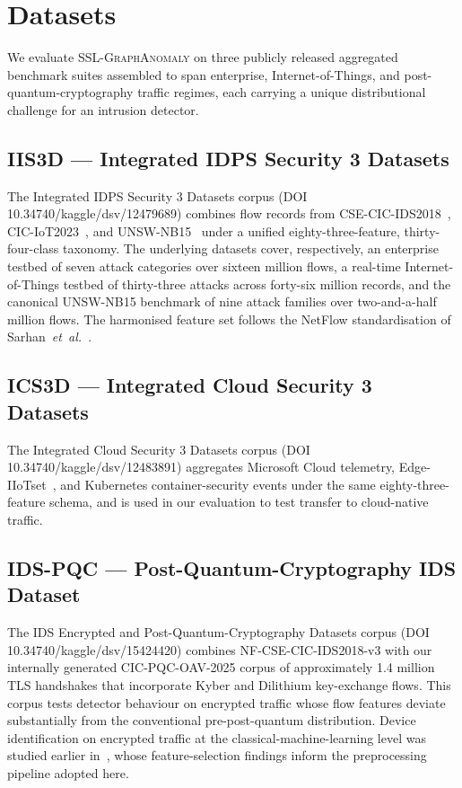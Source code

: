 \documentclass{ieeeaccess}
\begin{document}
\section{Datasets}
\label{sec:datasets}
We evaluate \textsc{SSL-GraphAnomaly} on three publicly released
aggregated benchmark suites assembled to span enterprise, Internet-of-Things,
and post-quantum-cryptography traffic regimes, each carrying a unique
distributional challenge for an intrusion detector.

\subsection{IIS3D --- Integrated IDPS Security 3 Datasets}
The Integrated IDPS Security 3 Datasets corpus (DOI 10.34740/kaggle/dsv/12479689)
combines flow records from CSE-CIC-IDS2018~\cite{sharafaldin2018cicids},
CIC-IoT2023~\cite{neto2023ciciot}, and UNSW-NB15~\cite{moustafa2015unswnb15}
under a unified eighty-three-feature, thirty-four-class taxonomy. The
underlying datasets cover, respectively, an enterprise testbed of seven
attack categories over sixteen million flows, a real-time
Internet-of-Things testbed of thirty-three attacks across forty-six million
records, and the canonical UNSW-NB15 benchmark of nine attack families over
two-and-a-half million flows. The harmonised feature set follows the
NetFlow standardisation of Sarhan~\emph{et~al.}~\cite{sarhan2022standard}.

\subsection{ICS3D --- Integrated Cloud Security 3 Datasets}
The Integrated Cloud Security 3 Datasets corpus
(DOI 10.34740/kaggle/dsv/12483891) aggregates Microsoft Cloud telemetry,
Edge-IIoTset~\cite{ferrag2022edgeiiot}, and Kubernetes container-security
events under the same eighty-three-feature schema, and is used in our
evaluation to test transfer to cloud-native traffic.

\subsection{IDS-PQC --- Post-Quantum-Cryptography IDS Dataset}
The IDS Encrypted and Post-Quantum-Cryptography Datasets corpus
(DOI 10.34740/kaggle/dsv/15424420) combines NF-CSE-CIC-IDS2018-v3 with our
internally generated CIC-PQC-OAV-2025 corpus of approximately
1.4 million TLS handshakes that incorporate Kyber and Dilithium key-exchange
flows. This corpus tests detector behaviour on encrypted traffic whose
flow features deviate substantially from the conventional pre-post-quantum
distribution. Device identification on encrypted traffic at the classical-machine-learning
level was studied earlier in~\cite{anaedevha2024deviceid}, whose
feature-selection findings inform the preprocessing pipeline adopted here.
\end{document}
